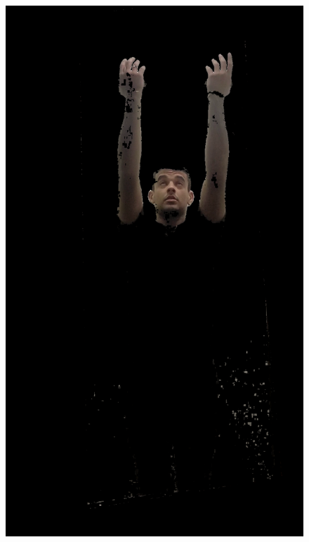 \begin{figure}[!htbp]
    \centering
        \begin{minipage}{\sizeImg\textwidth}
            \includegraphics[width=\textwidth]{figuras/mao_barra/skin.png}
        \end{minipage}
        \begin{minipage}{\sizeImg\textwidth}

\end{minipage}
\end{figure}
